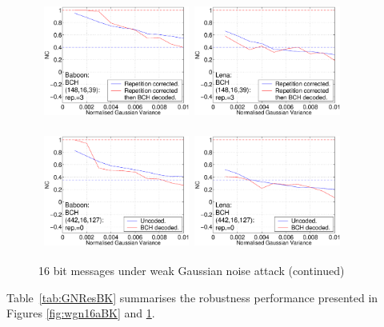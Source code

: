 \documentclass[12pt]{report}
\begin{document}
\begin{figure}[p]
\centerline{ \hbox{
\includegraphics[height=3.81cm,width=4.8cm]{EPS_BK_formattedBetter/WGbab148.eps}
\includegraphics[height=3.81cm,width=4.8cm]{EPS_BK_formattedBetter/WGlen148.eps} \\
}}
 
\centerline{ \hbox{
\includegraphics[height=3.81cm,width=4.8cm]{EPS_BK_formattedBetter/WGbab442.eps}
\includegraphics[height=3.81cm,width=4.8cm]{EPS_BK_formattedBetter/WGlen442.eps}
}}
 
 
        \caption{16 bit messages under weak Gaussian noise attack (continued)}
        \label{fig:wgn16bBK}
\setlength{\abovecaptionskip}{0cm}
\end{figure}
Table~\ref{tab:GNResBK} summarises the robustness performance presented in Figures \ref{fig:wgn16aBK} and \ref{fig:wgn16bBK}.
\end{document}
